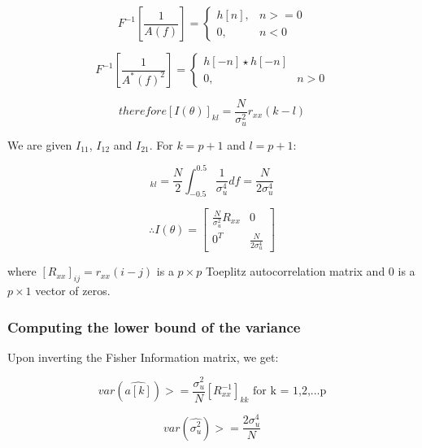 \documentclass{article}
\begin{document}
\begin{equation}
    F^{-1}[\frac{1}{A(f)}]=
    \begin{cases}
      h[n], & n>=0 \\
      0, & n<0
    \end{cases}
  \end{equation}
  
  \begin{equation}
    F^{-1}[\frac{1}{A^*(f)^2}]=
    \begin{cases}
      h[-n] \star h[-n] \\
      0, & n>0
    \end{cases}
  \end{equation}
  
\begin{equation}
therefore [I(\theta)]_{kl} = \frac{N}{\sigma_u^2}r_{xx}(k-l)
\end{equation}

We are given $I_{11}$, $I_{12}$ and $I_{21}$. For $k=p+1$ and $l=p+1$:

\begin{equation}
[I(\theta)]_{kl} = \frac{N}{2} \int_{-0.5}^{0.5} \frac{1}{\sigma_u^4} df = \frac{N}{2\sigma_u^4}
\end{equation}

\begin{equation}
\therefore I(\theta) = 
\begin{bmatrix}
\frac{N}{\sigma_u^2}R_{xx} & 0 \\
0^T & \frac{N}{2\sigma_u^4}
\end{bmatrix}
\end{equation}

where $[R_{xx}]_{ij} = r_{xx}(i-j)$ is a $p \times p$ Toeplitz autocorrelation matrix and 0 is a $p \times 1$ vector of zeros.

\subsubsection{Computing the lower bound of the variance}

Upon inverting the Fisher Information matrix, we get:

\begin{equation}
var(\hat{a[k]}) >= \frac{\sigma_u^2}{N} [R_{xx}^{-1}]_{kk} \text{  for k = 1,2,...p}
\end{equation}

\begin{equation}
var(\hat{\sigma_u^2}) >= \frac{2\sigma_u^4}{N}
\end{equation}
\end{document}
